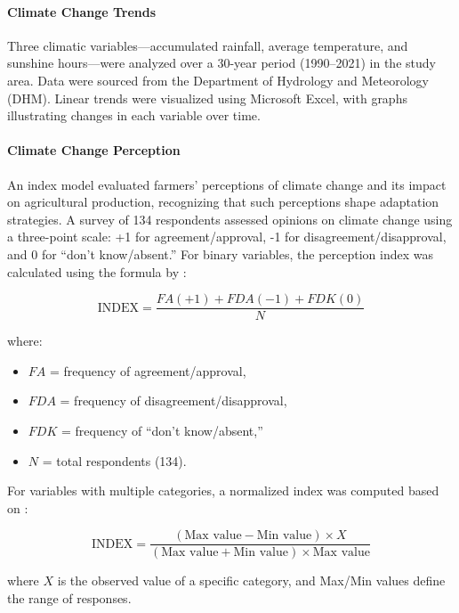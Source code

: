 \paragraph{Climate Change Trends}  
Three climatic variables---accumulated rainfall, average temperature, and sunshine hours---were analyzed over a 30-year period (1990--2021) in the study area. Data were sourced from the Department of Hydrology and Meteorology (DHM). Linear trends were visualized using Microsoft Excel, with graphs illustrating changes in each variable over time.

\paragraph{Climate Change Perception}  
An index model evaluated farmers’ perceptions of climate change and its impact on agricultural production, recognizing that such perceptions shape adaptation strategies. A survey of 134 respondents assessed opinions on climate change using a three-point scale: +1 for agreement/approval, -1 for disagreement/disapproval, and 0 for “don’t know/absent.” For binary variables, the perception index was calculated using the formula by \parencite{dahalNutrientManagementSustainability2021}:

\[
\text{INDEX} = \frac{FA(+1) + FDA(-1) + FDK(0)}{N}
\]

where:
\begin{itemize}
    \item $FA$ = frequency of agreement/approval,
    \item $FDA$ = frequency of disagreement/disapproval,
    \item $FDK$ = frequency of “don’t know/absent,”
    \item $N$ = total respondents (134).
\end{itemize}

For variables with multiple categories, a normalized index was computed based on \parencite{nguyenduycanAssessingLivelihoodVulnerability2019}:

\[
\text{INDEX} = \frac{(\text{Max value} - \text{Min value}) \times X}{(\text{Max value} + \text{Min value}) \times \text{Max value}}
\]

where $X$ is the observed value of a specific category, and Max/Min values define the range of responses.
